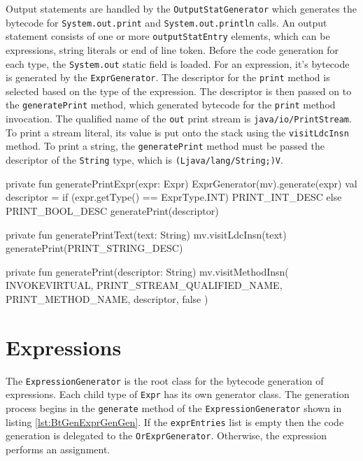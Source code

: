 Output statements are handled by the \verb|OutputStatGenerator| which generates the bytecode for \verb|System.out.print| and \verb|System.out.println| calls. An output statement consists of one or more \verb|outputStatEntry| elements, which can be expressions, string literals or end of line token. Before the code generation for each type, the \verb|System.out| static field is loaded. For an expression, it's bytecode is generated by the \verb|ExprGenerator|. The descriptor for the \verb|print| method is selected based on the type of the expression. The descriptor is then passed on to the \verb|generatePrint| method, which generated bytecode for the \verb|print| method invocation. The qualified name of the \verb|out| print stream is \texttt{java/io/PrintStream}. To print a stream literal, its value is put onto the stack using the \verb|visitLdcInsn| method. To print a string, the \verb|generatePrint| method must be passed the descriptor of the \verb|String| type, which is \texttt{(Ljava/lang/String;)V}. 


\begin{KotlinCode}[float,numbers=none,caption=Code for the print generation methods of the \texttt{OutputStatGenerator}., label=lst:BtGenOutputStatGen]
private fun generatePrintExpr(expr: Expr) {
    ExprGenerator(mv).generate(expr)
    val descriptor = if (expr.getType() == ExprType.INT) {
        PRINT_INT_DESC
    }else {
        PRINT_BOOL_DESC
    }
    generatePrint(descriptor)
}

private fun generatePrintText(text: String) {
    mv.visitLdcInsn(text)
    generatePrint(PRINT_STRING_DESC)
}

private fun generatePrint(descriptor: String) {
    mv.visitMethodInsn(
        INVOKEVIRTUAL,
        PRINT_STREAM_QUALIFIED_NAME,
        PRINT_METHOD_NAME,
        descriptor,
        false
    )
}
\end{KotlinCode}


\section{Expressions}

The \verb|ExpressionGenerator| is the root class for the bytecode generation of expressions. Each child type of \verb|Expr| has its own generator class. The generation process begins in the \verb|generate| method of the \verb|ExpressionGenerator| shown in listing \ref{lst:BtGenExprGenGen}. If the \verb|exprEntries| list is empty then the code generation is delegated to the \verb|OrExprGenerator|. Otherwise, the expression performs an assignment. 

